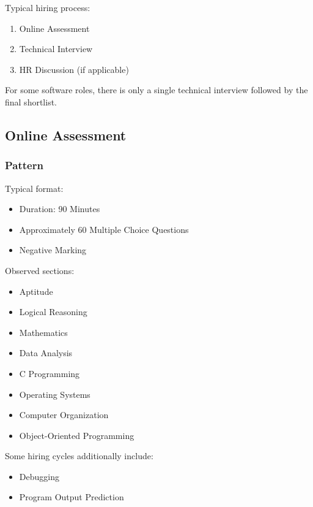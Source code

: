 \documentclass[11pt,a4paper]{article}
\begin{document}
Typical hiring process:

\begin{enumerate}
	\item Online Assessment
	\item Technical Interview
	\item HR Discussion (if applicable)
\end{enumerate}

For some software roles, there is only a single technical interview followed by the final shortlist.


\subsection{Online Assessment}

\subsubsection{Pattern}

Typical format:

\begin{itemize}
	\item Duration: 90 Minutes
	\item Approximately 60 Multiple Choice Questions
	\item Negative Marking
\end{itemize}

Observed sections:

\begin{itemize}
	\item Aptitude
	\item Logical Reasoning
	\item Mathematics
	\item Data Analysis
	\item C Programming
	\item Operating Systems
	\item Computer Organization
	\item Object-Oriented Programming
\end{itemize}

Some hiring cycles additionally include:

\begin{itemize}
	\item Debugging
	\item Program Output Prediction
\end{itemize}
\end{document}
